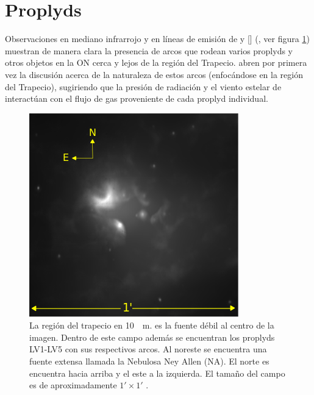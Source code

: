 \section{Proplyds}
Observaciones en mediano infrarrojo y en líneas de emisión de  y [] (\citet{Robberto:2005, Bally:1998, Bally:2000}, ver figura \ref{fig:prop-bally-robberto}) muestran de manera clara la presencia de arcos que rodean varios proplyds y otros objetos en la ON cerca y lejos de la región del Trapecio. \citet{Hayward:1994} abren por primera vez la discusión acerca de la naturaleza de estos arcos (enfocándose en la región del Trapecio), sugiriendo que la presión de radiación y el viento estelar de \thC{} interactúan con el flujo de gas proveniente de cada proplyd individual.

\begin{figure}
  \centering
  \includegraphics[width=0.7\linewidth]{./Figures/Orion_Robberto}
  \caption[La región del Trapecio]{La región del trapecio en \SI{10}{\mu m}. \thC{} es la fuente débil al centro de la imagen. Dentro de este campo además se encuentran los proplyds LV1-LV5 con sus respectivos arcos. Al noreste se encuentra una fuente extensa llamada la Nebulosa Ney Allen (NA). El norte es encuentra hacia arriba y el este a la izquierda. El tamaño del campo es de aproximadamente $1' \times 1'$ \citep{Robberto:2005}.}
  \label{fig:prop-bally-robberto}
\end{figure}

